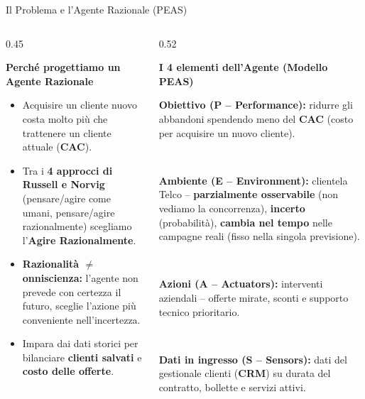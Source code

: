 \documentclass[aspectratio=169, 10pt]{beamer}
\newcommand{\card}[3]{%
    \colorbox{#1}{\parbox{\dimexpr#2-2\fboxsep\relax}{\raggedright #3}}%
}
\begin{document}
\begin{frame}{Il Problema e l'Agente Razionale (PEAS)}
    \begin{columns}[T, onlytextwidth]
        \begin{column}{0.45\textwidth}
            \raggedright
            \textbf{\color{PrimaryNavy} Perché progettiamo un Agente Razionale}
            \vspace{1.8mm}

            \begin{itemize}
                \setlength{\itemsep}{4.5pt}
                \footnotesize
                \item Acquisire un cliente nuovo costa molto più che trattenere un cliente attuale (\textbf{CAC}).
                \item Tra i \textbf{4 approcci di Russell e Norvig} (pensare/agire come umani, pensare/agire razionalmente) scegliamo l'\textbf{Agire Razionalmente}.
                \item \textbf{Razionalità $\neq$ onniscienza:} l'agente non prevede con certezza il futuro, sceglie l'azione più conveniente nell'incertezza.
                \item Impara dai dati storici per bilanciare \textbf{clienti salvati} e \textbf{costo delle offerte}.
            \end{itemize}
        \end{column}

        \begin{column}{0.52\textwidth}
            \raggedright
            \textbf{\color{PrimaryNavy} I 4 elementi dell'Agente (Modello PEAS)}
            \vspace{1.8mm}

            \card{CardBlue}{\linewidth}{\footnotesize
                \textbf{\color{PrimaryNavy} Obiettivo (P -- Performance):} ridurre gli abbandoni spendendo meno del \textbf{CAC} (costo per acquisire un nuovo cliente).
            }\\[2mm]
            \card{CardAmber}{\linewidth}{\footnotesize
                \textbf{\color{AccentAmber} Ambiente (E -- Environment):} clientela Telco -- \textbf{parzialmente osservabile} (non vediamo la concorrenza), \textbf{incerto} (probabilità), \textbf{cambia nel tempo} nelle campagne reali (fisso nella singola previsione).
            }\\[2mm]
            \card{CardGreen}{\linewidth}{\footnotesize
                \textbf{\color{AccentGreen} Azioni (A -- Actuators):} interventi aziendali -- offerte mirate, sconti e supporto tecnico prioritario.
            }\\[2mm]
            \card{CardBlue}{\linewidth}{\footnotesize
                \textbf{\color{PrimaryNavy} Dati in ingresso (S -- Sensors):} dati del gestionale clienti (\textbf{CRM}) su durata del contratto, bollette e servizi attivi.
            }
        \end{column}
    \end{columns}
\end{frame}
\end{document}
